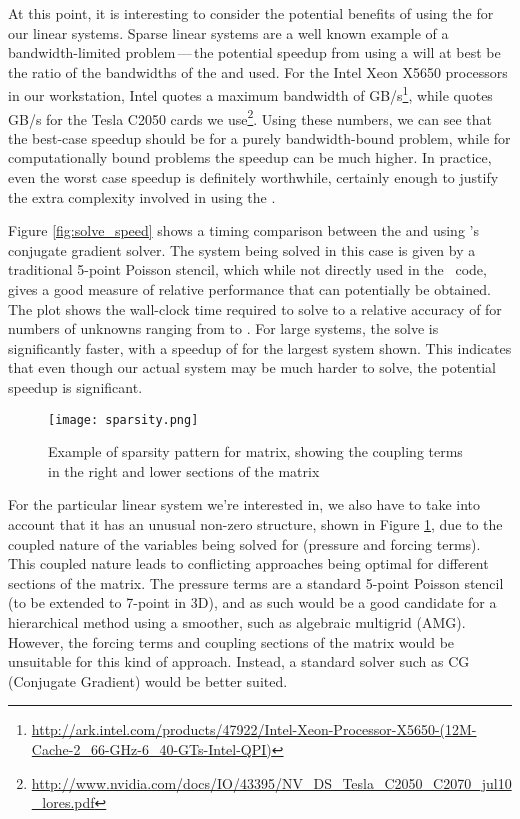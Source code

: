 At this point, it is interesting to consider the potential benefits of using the {\gpu} for our linear systems. Sparse linear systems are a well known example of a bandwidth-limited problem\,---\,the potential speedup from using a {\gpu} will at best be the ratio of the bandwidths of the {\cpu} and {\gpu} used. For the Intel Xeon X5650 processors in our workstation, Intel quotes a maximum bandwidth of  GB/s\footnote{\href{http://ark.intel.com/products/47922/Intel-Xeon-Processor-X5650-(12M-Cache-2_66-GHz-6_40-GTs-Intel-QPI)}{http://ark.intel.com/products/47922/Intel-Xeon-Processor-X5650-(12M-Cache-2\_66-GHz-6\_40-GTs-Intel-QPI)}}, while {\NV} quotes  GB/s for the Tesla C2050 cards we use\footnote{\href{http://www.nvidia.com/docs/IO/43395/NV_DS_Tesla_C2050_C2070_jul10_lores.pdf}{http://www.nvidia.com/docs/IO/43395/NV\_DS\_Tesla\_C2050\_C2070\_jul10\_lores.pdf}}. Using these numbers, we can see that the best-case speedup should be  for a purely bandwidth-bound problem, while for computationally bound problems the speedup can be much higher. In practice, even the worst case speedup is definitely worthwhile, certainly enough to justify the extra complexity involved in using the {\gpu}.

Figure \ref{fig:solve_speed} shows a timing comparison between the {\cpu} and {\gpu} using {\cusp}'s conjugate gradient solver. The system being solved in this case is given by a traditional 5-point Poisson stencil, which while not directly used in the \ibm\ code, gives a good measure of relative performance that can potentially be obtained. The plot shows the wall-clock time required to solve to a relative accuracy of  for numbers of unknowns ranging from  to . For large systems, the {\gpu} solve is significantly faster, with a speedup of  for the largest system shown. This indicates that even though our actual system may be much harder to solve, the potential speedup is significant.

\begin{figure}[h]\centering
	\texttt{[image: sparsity.png]}
	\caption{\small Example of sparsity pattern for  matrix, showing the coupling terms in the right and lower sections of the matrix}
\label{fig:sparsity}
\end{figure}

For the particular linear system we're interested in, we also have to take into account that it has an unusual non-zero structure, shown in Figure \ref{fig:sparsity}, due to the coupled nature of the variables being solved for (pressure and forcing terms). This coupled nature leads to conflicting approaches being optimal for different sections of the matrix. The pressure terms are a standard 5-point Poisson stencil (to be extended to 7-point in 3D), and as such would be a good candidate for a hierarchical method using a smoother, such as algebraic multigrid (AMG). However, the forcing terms and coupling sections of the matrix would be unsuitable for this kind of approach. Instead, a standard solver such as CG (Conjugate Gradient) would be better suited.

